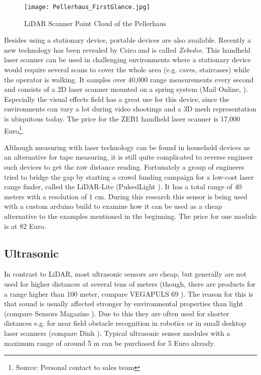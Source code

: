 \begin{figure}[h]
	\centering
	\texttt{[image: Pellerhaus\_FirstGlance.jpg]}
	\caption{LiDAR Scanner Point Cloud of the Pellerhaus}
	\label{fig:LiDAR_PointCloud}
\end{figure}

Besides using a stationary device, portable devices are also available. Recently a new technology has been revealed by Csiro and is called \textit{Zebedee}. This handheld laser scanner can be used in challenging environments where a stationary device would require several scans to cover the whole area (e.g. caves, staircases) while the operator is walking. It samples over 40,000 range measurements every second and consists of a 2D laser scanner mounted on a spring system (Mail Online, \parencite{zebedee_info}). Especially the visual effects field has a great use for this device, since the environments can vary a lot during video shootings and a 3D mesh representation is ubiquitous today. The price for the ZEB1 handheld laser scanner is 17,000 Euro\footnote{Source: Personal contact to sales team}.

Although measuring with laser technology can be found in household devices as an alternative for tape measuring, it is still quite complicated to reverse engineer such devices to get the raw distance reading. Fortunately a group of engineers tried to bridge the gap by starting a crowd funding campaign for a low-cost laser range finder, called the LiDAR-Lite (PulsedLight \parencite{pulsedlight}). It has a total range of 40 meters with a resolution of 1 cm. During this research this sensor is being used with a custom arduino build to examine how it can be used as a cheap alternative to the examples mentioned in the beginning. The price for one module is at 82 Euro.

\subsection{Ultrasonic}

In contrast to LiDAR, most ultrasonic sensors are cheap, but generally are not used for higher distances at several tens of meters (though, there are products for a range higher than 100 meter, compare VEGAPULS 69 \parencite{vegapuls}). The reason for this is that sound is usually affected stronger by environmental properties than light (compare Sensors Magazine \parencite{sensorsmag}). Due to this they are often used for shorter distances e.g. for near field obstacle recognition in robotics or in small desktop laser scanners (compare Dinh \parencite{yt_smalldesktoplaser}). Typical ultrasonic sensor modules with a maximum range of around 5 m can be purchased for 5 Euro already.



